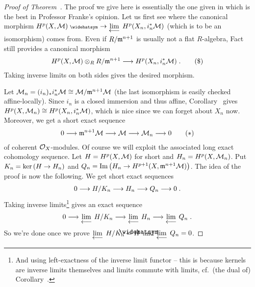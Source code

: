 \documentclass[a4paper,parskip=half,numbers=enddot, DIV=12]{scrreprt}
\begin{document}
\begin{proof}[Proof of Theorem~]
	The proof we give here is essentially the one given in \cite[(4.1.7)]{egaIII} which is the best in Professor Franke's opinion. Let us first see where the canonical morphism $H^p(X,\Mm)^\complete \morphism\limit H^p(X_n,i_n^*\Mm)$ (which is to be an isomorphism) comes from. Even if $R/\mathfrak{m}^{n+1}$ is usually not a flat $R$-algebra, Fact~ still provides a canonical morphism
	\begin{align}\lbl{eq:canMorphismFF}
		H^p(X,\Mm)\otimes_RR/\mm^{n+1}\morphism H^p(X_n,i_n^*\Mm)\;.\tag{\$}
	\end{align}
	Taking inverse limits on both sides gives the desired morphism.
	
	Let $\mathcal{M}_n=(i_n)_*i_n^*\mathcal{M}\cong\mathcal{M}/\mathfrak{m}^{n+1}\mathcal{M}$ (the last isomorphism is easily checked affine-locally). Since $i_n$ is a closed immersion and thus affine, Corollary~ gives $H^p(X,\mathcal{M}_n)\cong H^p(X_n,i_n^*\mathcal{M})$, which is nice since we can forget about $X_n$ now. Moreover, we get a short exact sequence
	\begin{align}\lbl{eq:lesFormalFunctions}
		0\morphism \mm^{n+1}\Mm\morphism\Mm\morphism\Mm_n\morphism 0\tag{$*$}
	\end{align}
	of coherent $\mathcal{O}_X$-modules. Of course we will exploit the associated long exact cohomology sequence. Let $H=H^p(X,\mathcal{M})$ for short and $H_n=H^p(X,\mathcal{M}_n)$. Put $K_n=\ker\left(H\morphism H_n\right)$ and $Q_n=\Im\left(H_n\morphism H^{p+1}(X,\mm^{n+1}\Mm)\right)$. The idea of the proof is now the following. We get short exact sequences
	\begin{align*}
		0\morphism H/K_n\morphism H_n\morphism Q_n\morphism 0\;.
	\end{align*}
	Taking inverse limits\footnote{And using left-exactness of the inverse limit functor -- this is because kernels are inverse limits themselves and limits commute with limits, cf.\ (the dual of) Corollary~.} gives an exact sequence
	\begin{align*}
		0\morphism\limit H/K_n\morphism\limit H_n\morphism\limit Q_n\;.
	\end{align*}
	So we're done once we prove $\limit H/K_n=\roof{H}$ and $\limit Q_n=0$.
	

\end{proof}
\end{document}
